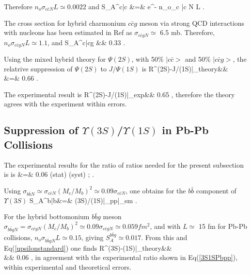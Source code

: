 Therefore $ n_o\sigma_{c \bar{c} N} L \simeq 0.0022$ and
\beq
\label{SAcc}
          S_A^{c\bar{c}} &=& e^{- n_o\sigma_{c \bar{c} N} L}  \; .
\eeq

 The cross section for hybrid charmonium $c\bar{c}g$ meson 
via strong QCD interactions with nucleons has been estimated in Ref\cite{ks95}
as $\sigma_{c\bar{c}g N} \simeq$ 6.5 mb. Therefore, $n_o\sigma_{c\bar{c}g N} L
\simeq 1.1$, and
\beq
\label{SAccg}
   S_A^{c\bar{c}g} &\simeq&  0.33  \; .
\eeq 

Using the mixed hybrid  theory for $\Psi(2S)$, with 50\% $|c\bar{c}>$ and 
50\% $|c\bar{c}g>$, the relatrive suppression of $\Psi(2S)$ to $J/\Psi(1S)$
is
\beq
\label{SAratio}
    R^{\Psi(2S)-J/\Psi(1S)}|_{theory}&\simeq&  
\nonumber \\
          &=& 0.66 \; .
\eeq 

The experimental result\cite{ALICE14} is
\beq
\label{exp-suppression}
        R^{\Psi(2S)-J/\Psi(1S)}|_{exp}&\simeq& 0.65  \; ,
\eeq  
therefore the theory agrees with the experiment within errors.

\subsection{Suppression of  $\Upsilon(3S)$/$\Upsilon(1S)$ in Pb-Pb 
Collisions}

  The experimental results for the ratio of ratios needed for the present
subsection is\cite{cms12} is
\beq
\label{3S1SPbpp}
     &=& 0.06  ({\rm stat}) ({\rm syst}) ; .
\eeq

Using  $\sigma_{b\bar{b} N}\simeq \sigma_{c\bar{c} N}(M_c/M_b)^2\simeq 0.09 
\sigma_{c\bar{c} N}$, one obtains for the $b\bar{b}$ component of $\Upsilon(3S)$
\beq
\label{upsilonstandard}
 S_A^{b\bar{b}}&=&
{\Upsilon(3S)/\Upsilon(1S)|_{pp}}|_{sm}  \; .
\eeq

 For the  hybrid bottomonium $b\bar{b}g$ meson $\sigma_{b\bar{b}g N}=
\sigma_{c\bar{c}g N}(M_c/M_b)^2\simeq 0.09 \sigma_{c\bar{c}g N} \simeq 0.059 fm^2$,
and with $L \simeq$ 15 fm for Pb-Pb collisions, $n_o\sigma_{b\bar{b}g N} L \simeq
 0.15$, giving $S_A^{b\bar{b}g} \simeq 0.017$. From this and 
Eq(\ref{upsilonstandard}) one finds\cite{lsk16}
\beq
\label{SAbbratio}
    R^{\Upsilon(3S)-\Upsilon(1S)}|_{theory}&\simeq&  
\nonumber \\
          &\simeq& 0.06 \;,
\eeq  
in agreement with  the experimental ratio shown in Eq(\ref{3S1SPbpp}),
within experimental and theoretical errors.

